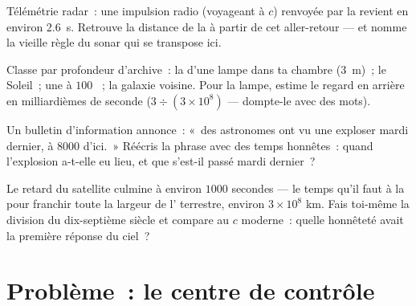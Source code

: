 \begin{exercise}[$\star\star$]\label{exo:g8:speed-of-light:9}
Télémétrie radar~: une impulsion radio (voyageant à $c$) renvoyée par
la  revient en environ \qty{2.6}{s}. Retrouve la distance de la
 à partir de cet aller-retour --- et nomme la vieille règle du
sonar qui se transpose ici.
\end{exercise}

\begin{exercise}[$\star\star$]\label{exo:g8:speed-of-light:10}
Classe par profondeur d'archive~: la  d'une lampe dans ta
chambre (\qty{3}{m})~; le Soleil~; une  à $100$
~; la galaxie voisine. Pour la lampe, estime le regard
en arrière en milliardièmes de seconde ($3 \div (3 \times 10^{8})$ ---
dompte-le avec des mots).
\end{exercise}

\begin{exercise}[$\star\star$]\label{exo:g8:speed-of-light:11}
Un bulletin d'information annonce~: «~des astronomes ont vu une 
exploser mardi dernier, à $8000$  d'ici.~» Réécris la
phrase avec des temps honnêtes~: quand l'explosion a-t-elle eu lieu,
et que s'est-il passé mardi dernier~?
\end{exercise}

\begin{exercise}[$\star\star\star$]\label{exo:g8:speed-of-light:12}
Le retard du satellite culmine à environ $1000$ secondes --- le temps
qu'il faut à la  pour franchir toute la largeur de l'
terrestre, environ $3 \times 10^{8}$ km. Fais toi-même la division du
dix-septième siècle et compare au $c$ moderne~: quelle honnêteté
avait la première réponse du ciel~?
\end{exercise}

\section{Problème~: le centre de contrôle}

